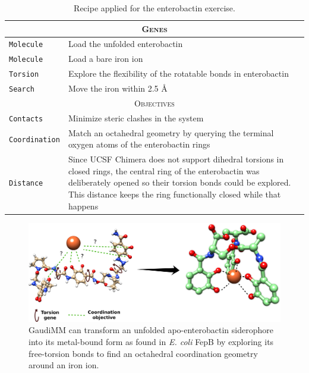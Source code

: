 \begin{table}[hbtp]
	\caption[Recipe applied for the enterobactin exercise]{Recipe applied for the enterobactin exercise.}
	\label{table:siderophore}
	\footnotesize
	\newcommand{\tableheading}[1]{\multicolumn{2}{c}{\textsc{#1}}}
	\begin{tabularx}{\textwidth}{RL}
		\toprule
		\tableheading{Genes}\\
		\toprule
		\texttt{Molecule} & Load the unfolded enterobactin\cite{Enterobactin} \\
		\midrule
		\texttt{Molecule} & Load a bare iron ion \\
		\midrule
		\texttt{Torsion} & Explore the flexibility of the rotatable bonds in enterobactin \\
		\midrule
		\texttt{Search} & Move the iron within 2.5 \AA \\
		\toprule
		\tableheading{Objectives}\\
		\toprule
		\texttt{Contacts} & Minimize steric clashes in the system \\
		\midrule
		\texttt{Coordination} & Match an octahedral geometry by querying the terminal oxygen atoms of the enterobactin rings \\
		\midrule
		\texttt{Distance} & Since UCSF Chimera does not support dihedral torsions in closed rings, the central ring of the enterobactin was deliberately opened so their torsion bonds could be explored. This distance keeps the ring functionally closed while that happens \\
		\bottomrule
	\end{tabularx}
\end{table}


\begin{figure}[H] %
	\begin{Center}
		\includegraphics[width=\textwidth]{./figures/06/siderophore.png}
	\end{Center}
	\cprotect\caption[Siderophore folding]{GaudiMM can transform an unfolded apo-enterobactin siderophore into its metal-bound form as found in \textit{E. coli} FepB by exploring its free-torsion bonds to find an octahedral coordination geometry around an iron ion.}
	\label{fig:siderophore}
\end{figure}


